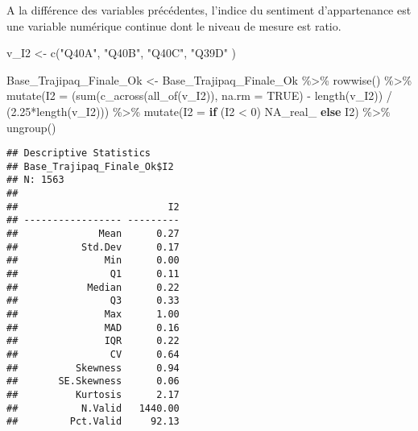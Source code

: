 \documentclass[
]{article}
\newenvironment{Shaded}{\begin{snugshade}}{\end{snugshade}}
\newcommand{\AttributeTok}[1]{\textcolor[rgb]{0.77,0.63,0.00}{#1}}
\newcommand{\ConstantTok}[1]{\textcolor[rgb]{0.00,0.00,0.00}{#1}}
\newcommand{\ControlFlowTok}[1]{\textcolor[rgb]{0.13,0.29,0.53}{\textbf{#1}}}
\newcommand{\DecValTok}[1]{\textcolor[rgb]{0.00,0.00,0.81}{#1}}
\newcommand{\FloatTok}[1]{\textcolor[rgb]{0.00,0.00,0.81}{#1}}
\newcommand{\FunctionTok}[1]{\textcolor[rgb]{0.00,0.00,0.00}{#1}}
\newcommand{\NormalTok}[1]{#1}
\newcommand{\OtherTok}[1]{\textcolor[rgb]{0.56,0.35,0.01}{#1}}
\newcommand{\SpecialCharTok}[1]{\textcolor[rgb]{0.00,0.00,0.00}{#1}}
\newcommand{\StringTok}[1]{\textcolor[rgb]{0.31,0.60,0.02}{#1}}
\begin{document}
A la différence des variables précédentes, l'indice du sentiment
d'appartenance est une variable numérique continue dont le niveau de
mesure est ratio.

\begin{Shaded}
\begin{Highlighting}[]
\NormalTok{v\_I2 }\OtherTok{\textless{}{-}} \FunctionTok{c}\NormalTok{(}\StringTok{"Q40A"}\NormalTok{,}
          \StringTok{"Q40B"}\NormalTok{,}
          \StringTok{"Q40C"}\NormalTok{,}
          \StringTok{"Q39D"}
\NormalTok{          )}

\NormalTok{Base\_Trajipaq\_Finale\_Ok }\OtherTok{\textless{}{-}}
\NormalTok{  Base\_Trajipaq\_Finale\_Ok }\SpecialCharTok{\%\textgreater{}\%}
  \FunctionTok{rowwise}\NormalTok{() }\SpecialCharTok{\%\textgreater{}\%}
  \FunctionTok{mutate}\NormalTok{(}\AttributeTok{I2 =}\NormalTok{ (}\FunctionTok{sum}\NormalTok{(}\FunctionTok{c\_across}\NormalTok{(}\FunctionTok{all\_of}\NormalTok{(v\_I2)), }\AttributeTok{na.rm =} \ConstantTok{TRUE}\NormalTok{) }\SpecialCharTok{{-}} \FunctionTok{length}\NormalTok{(v\_I2)) }\SpecialCharTok{/}\NormalTok{ (}\FloatTok{2.25}\SpecialCharTok{*}\FunctionTok{length}\NormalTok{(v\_I2))) }\SpecialCharTok{\%\textgreater{}\%}
  \FunctionTok{mutate}\NormalTok{(}\AttributeTok{I2 =} \ControlFlowTok{if}\NormalTok{ (I2 }\SpecialCharTok{\textless{}} \DecValTok{0}\NormalTok{) }\ConstantTok{NA\_real\_} \ControlFlowTok{else}\NormalTok{ I2) }\SpecialCharTok{\%\textgreater{}\%}
  \FunctionTok{ungroup}\NormalTok{()}
\end{Highlighting}
\end{Shaded}

\begin{Shaded}
\end{Shaded}

\begin{verbatim}
## Descriptive Statistics  
## Base_Trajipaq_Finale_Ok$I2  
## N: 1563  
## 
##                          I2
## ----------------- ---------
##              Mean      0.27
##           Std.Dev      0.17
##               Min      0.00
##                Q1      0.11
##            Median      0.22
##                Q3      0.33
##               Max      1.00
##               MAD      0.16
##               IQR      0.22
##                CV      0.64
##          Skewness      0.94
##       SE.Skewness      0.06
##          Kurtosis      2.17
##           N.Valid   1440.00
##         Pct.Valid     92.13
\end{verbatim}
\end{document}
